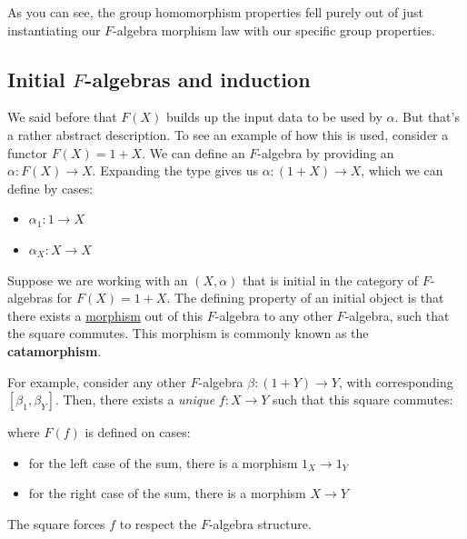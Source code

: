 \documentclass{article}
\theoremstyle{plain}
\theoremstyle{definition}
\begin{document}
As you can see, the group homomorphism properties fell purely out of just instantiating our \ensuremath{F}-algebra morphism law with our specific group properties.





\subsection{Initial \ensuremath{F}-algebras and induction}


We said before that \ensuremath{F\left( X \right)} builds up the input data to be used by \ensuremath{\alpha}. But that's a rather abstract description. To see an example of how this is used, consider a functor \ensuremath{F\left( X \right) = 1 + X}. We can define an \ensuremath{F}-algebra by providing an \ensuremath{\alpha : F\left( X \right) \rightarrow X}. Expanding the type gives us \ensuremath{\alpha : \left( 1 + X \right) \rightarrow X}, which we can define by cases: \begin{itemize}
\item \ensuremath{{\alpha }_{1} : 1 \rightarrow X}
\item \ensuremath{{\alpha }_{X} : X \rightarrow X}
\end{itemize}


Suppose we are working with an \ensuremath{\left( X, \alpha \right)} that is initial in the category of \ensuremath{F}-algebras for \ensuremath{F\left( X \right) = 1 + X}. The defining property of an initial object is that there exists a \href{}{morphism} out of this \ensuremath{F}-algebra to any other \ensuremath{F}-algebra, such that the square commutes. This morphism is commonly known as the \textbf{catamorphism}.

For example, consider any other \ensuremath{F}-algebra \ensuremath{\beta : \left( 1 + Y \right) \rightarrow Y}, with corresponding \ensuremath{\left[ {\beta }_{1}, {\beta }_{Y} \right]}. Then, there exists a \emph{unique} \ensuremath{f : X \rightarrow Y} such that this square commutes:


\begin{center}
\end{center}


where \ensuremath{F\left( f \right)} is defined on cases: \begin{itemize}
\item for the left case of the sum, there is a morphism \ensuremath{{1}_{X} \rightarrow {1}_{Y}}
\item for the right case of the sum, there is a morphism \ensuremath{X \rightarrow Y}
\end{itemize}
The square forces \ensuremath{f} to respect the \ensuremath{F}-algebra structure.
\end{document}
